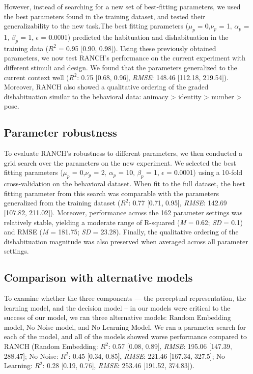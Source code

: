 \documentclass[10pt, letterpaper]{article}
\begin{document}
However, instead of searching for a new set of best-fitting parameters,
we used the best parameters found in the training dataset, and tested
their generalizability to the new task.The best fitting parameters
(\(\mu_{p}\) = 0,\(\nu_{p}\) = 1, \(\alpha_{p}\) = 1, \(\beta_{p}\) = 1,
\(\epsilon\) = 0.0001) predicted the habituation and dishabituation in
the training data (\(R^2\) = 0.95 {[}0.90, 0.98{]}). Using these
previously obtained parameters, we now test RANCH's performance on the
current experiment with different stimuli and design. We found that the
parameters generalized to the current context well (\(R^2\): 0.75
{[}0.68, 0.96{]}, \emph{RMSE}: 148.46 {[}112.18, 219.54{]}). Moreover,
RANCH also showed a qualitative ordering of the graded dishabituation
similar to the behavioral data: animacy \textgreater{} identity
\textgreater{} number \textgreater{} pose.

\hypertarget{parameter-robustness}{%
\subsection{Parameter robustness}\label{parameter-robustness}}

To evaluate RANCH's robustness to different parameters, we then
conducted a grid search over the parameters on the new experiment. We
selected the best fitting parameters (\(\mu_{p}\) = 0,\(\nu_{p}\) = 2,
\(\alpha_{p}\) = 10, \(\beta_{p}\) = 1, \(\epsilon\) = 0.0001) using a
10-fold cross-validation on the behavioral dataset. When fit to the full
dataset, the best fitting parameter from this search was comparable with
the parameters generalized from the training dataset (\(R^2\): 0.77
{[}0.71, 0.95{]}, \emph{RMSE}: 142.69 {[}107.82, 211.02{]}). Moreover,
performance across the 162 parameter settings was relatively stable,
yielding a moderate range of R-squared (\emph{M} = 0.62; \emph{SD} =
0.1) and RMSE (\emph{M} = 181.75; \emph{SD} = 23.28). Finally, the
qualitative ordering of the dishabituation magnitude was also preserved
when averaged across all parameter settings.

\hypertarget{comparison-with-alternative-models}{%
\subsection{Comparison with alternative
models}\label{comparison-with-alternative-models}}

To examine whether the three components --- the perceptual
representation, the learning model, and the decision model -- in our
models were critical to the success of our model, we ran three
alternative models: Random Embedding model, No Noise model, and No
Learning Model. We ran a parameter search for each of the model, and all
of the models showed worse performance compared to RANCH (Random
Embedding: \(R^2\): 0.57 {[}0.08, 0.89{]}, \emph{RMSE}: 195.06
{[}147.39, 288.47{]}; No Noise: \(R^2\): 0.45 {[}0.34, 0.85{]},
\emph{RMSE}: 221.46 {[}167.34, 327.5{]}; No Learning: \(R^2\): 0.28
{[}0.19, 0.76{]}, \emph{RMSE}: 253.46 {[}191.52, 374.83{]}).
\end{document}
